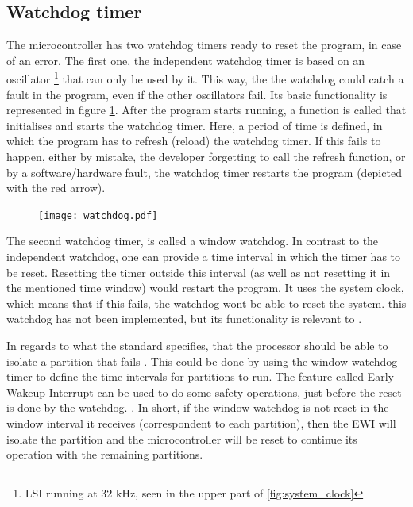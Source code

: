 \subsection{Watchdog timer}
The microcontroller has two watchdog timers ready to reset the program, in case of an error.
The first one, the independent watchdog timer is based on an oscillator
\footnote{LSI running at 32 kHz, seen in the upper part of
 \ref{fig:system_clock}}
that can only be used by it.
 This way,
the the watchdog could catch a fault in the program, even if the other
oscillators fail. Its basic functionality is represented in figure
\ref{fig:watchdog}. After the program starts running, a function is called
that initialises and starts the watchdog timer. Here, a period of time is defined, in which the program has to refresh (reload) the watchdog timer.
If this fails to happen, either by mistake, the developer forgetting to 
call the refresh function, or by a software/hardware fault, the watchdog 
timer restarts the program (depicted with the red arrow).

\begin{figure}[H]
\centering
\texttt{[image: watchdog.pdf]}
\label{fig:watchdog}
\end{figure}


The second watchdog timer, is called a window watchdog.
 In contrast 
to the independent watchdog, one can provide a time interval in which
the timer has to be reset. Resetting the timer outside this interval
(as well as not resetting it in the mentioned time window) would restart
the program. It uses the system clock, which means that if this fails,
the watchdog won\textquotesingle t be able to reset the system. this 
watchdog has not been implemented, but its functionality is relevant 
to \OSname{}.

In regards to what the standard specifies, that the processor should be able
to isolate a partition that fails \cite{arinc_page_12}. This could be done by 
using the window watchdog timer to define the time intervals for partitions 
to run. The feature called Early Wakeup Interrupt can be used to do some
safety operations, just before the reset is done by the watchdog.
\cite{reference_manual_716}.
In short, if the window watchdog is not reset in the window interval it
receives (correspondent to each partition), then the EWI will isolate the
partition and the microcontroller will be reset to continue its operation
with the remaining partitions.

